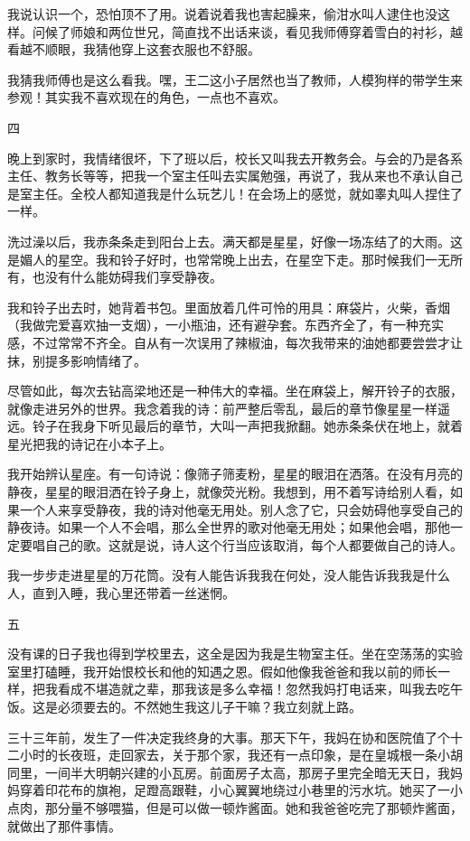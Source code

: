  我说认识一个，恐怕顶不了用。说着说着我也害起臊来，偷泔水叫人逮住也没这样。问候了师娘和两位世兄，简直找不出话来谈，看见我师傅穿着雪白的衬衫，越看越不顺眼，我猜他穿上这套衣服也不舒服。 
 
 我猜我师傅也是这么看我。嘿，王二这小子居然也当了教师，人模狗样的带学生来参观！其实我不喜欢现在的角色，一点也不喜欢。 
 
 四 
 
 晚上到家时，我情绪很坏，下了班以后，校长又叫我去开教务会。与会的乃是各系主任、教务长等等，把我一个室主任叫去实属勉强，再说了，我从来也不承认自己是室主任。全校人都知道我是什么玩艺儿！在会场上的感觉，就如睾丸叫人捏住了一样。 
 
 洗过澡以后，我赤条条走到阳台上去。满天都是星星，好像一场冻结了的大雨。这是媚人的星空。我和铃子好时，也常常晚上出去，在星空下走。那时候我们一无所有，也没有什么能妨碍我们享受静夜。 
 
 我和铃子出去时，她背着书包。里面放着几件可怜的用具：麻袋片，火柴，香烟（我做完爱喜欢抽一支烟），一小瓶油，还有避孕套。东西齐全了，有一种充实感，不过常常不齐全。自从有一次误用了辣椒油，每次我带来的油她都要尝尝才让抹，别提多影响情绪了。 
 
 尽管如此，每次去钻高梁地还是一种伟大的幸福。坐在麻袋上，解开铃子的衣服，就像走进另外的世界。我念着我的诗：前严整后零乱，最后的章节像星星一样遥远。铃子在我身下听见最后的章节，大叫一声把我掀翻。她赤条条伏在地上，就着星光把我的诗记在小本子上。 
 
 我开始辨认星座。有一句诗说：像筛子筛麦粉，星星的眼泪在洒落。在没有月亮的静夜，星星的眼泪洒在铃子身上，就像荧光粉。我想到，用不着写诗给别人看，如果一个人来享受静夜，我的诗对他毫无用处。别人念了它，只会妨碍他享受自己的静夜诗。如果一个人不会唱，那么全世界的歌对他毫无用处；如果他会唱，那他一定要唱自己的歌。这就是说，诗人这个行当应该取消，每个人都要做自己的诗人。 
 
 我一步步走进星星的万花筒。没有人能告诉我我在何处，没人能告诉我我是什么人，直到入睡，我心里还带着一丝迷惘。 
 
 五 
 
 没有课的日子我也得到学校里去，这全是因为我是生物室主任。坐在空荡荡的实验室里打磕睡，我开始恨校长和他的知遇之恩。假如他像我爸爸和我以前的师长一样，把我看成不堪造就之辈，那我该是多么幸福！忽然我妈打电话来，叫我去吃午饭。这是必须要去的。不然她生我这儿子干嘛？我立刻就上路。 
 
 三十三年前，发生了一件决定我终身的大事。那天下午，我妈在协和医院值了个十二小时的长夜班，走回家去，关于那个家，我还有一点印象，是在皇城根一条小胡同里，一间半大明朝兴建的小瓦房。前面房子太高，那房子里完全暗无天日，我妈妈穿着印花布的旗袍，足蹬高跟鞋，小心翼翼地绕过小巷里的污水坑。她买了一小点肉，那分量不够喂猫，但是可以做一顿炸酱面。她和我爸爸吃完了那顿炸酱面，就做出了那件事情。 
 
